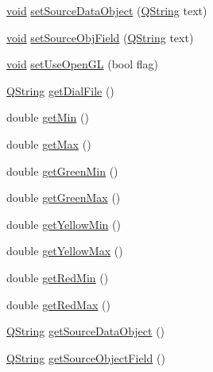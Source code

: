 \begin{DoxyCompactItemize}
\item 
\hyperlink{group___u_a_v_objects_plugin_ga444cf2ff3f0ecbe028adce838d373f5c}{void} \hyperlink{group___linear_dial_plugin_gab0e129448ff276e38c2fc87cb8883e62}{set\-Source\-Data\-Object} (\hyperlink{group___u_a_v_objects_plugin_gab9d252f49c333c94a72f97ce3105a32d}{\-Q\-String} text)
\item 
\hyperlink{group___u_a_v_objects_plugin_ga444cf2ff3f0ecbe028adce838d373f5c}{void} \hyperlink{group___linear_dial_plugin_gace43fd36313161f4a963e2b95a445354}{set\-Source\-Obj\-Field} (\hyperlink{group___u_a_v_objects_plugin_gab9d252f49c333c94a72f97ce3105a32d}{\-Q\-String} text)
\item 
\hyperlink{group___u_a_v_objects_plugin_ga444cf2ff3f0ecbe028adce838d373f5c}{void} \hyperlink{group___linear_dial_plugin_ga3834f5a345c01cce74297c2a65a82523}{set\-Use\-Open\-G\-L} (bool flag)
\item 
\hyperlink{group___u_a_v_objects_plugin_gab9d252f49c333c94a72f97ce3105a32d}{\-Q\-String} \hyperlink{group___linear_dial_plugin_ga44cbe980684b267ae41060c0428e00ce}{get\-Dial\-File} ()
\item 
double \hyperlink{group___linear_dial_plugin_ga43b18753744079052cb3b4e58a226eab}{get\-Min} ()
\item 
double \hyperlink{group___linear_dial_plugin_gae8b0681f133693a66256022babdca5cc}{get\-Max} ()
\item 
double \hyperlink{group___linear_dial_plugin_gaac4e3bef42979801094f4b3c47d83a07}{get\-Green\-Min} ()
\item 
double \hyperlink{group___linear_dial_plugin_gaf0f52dd07291d938390b228e8e0a90f2}{get\-Green\-Max} ()
\item 
double \hyperlink{group___linear_dial_plugin_gad39b6746e6b3b7c0e6d20794d2f494d9}{get\-Yellow\-Min} ()
\item 
double \hyperlink{group___linear_dial_plugin_ga2c58391f9aa712de50504d4437b54ded}{get\-Yellow\-Max} ()
\item 
double \hyperlink{group___linear_dial_plugin_ga2144cb1d1c1c13bd87529460a3ad88bc}{get\-Red\-Min} ()
\item 
double \hyperlink{group___linear_dial_plugin_ga022f5eeb2931bde01bb130ac6cb237b7}{get\-Red\-Max} ()
\item 
\hyperlink{group___u_a_v_objects_plugin_gab9d252f49c333c94a72f97ce3105a32d}{\-Q\-String} \hyperlink{group___linear_dial_plugin_ga6b635f5d74e7815014a597e5a38e5e80}{get\-Source\-Data\-Object} ()
\item 
\hyperlink{group___u_a_v_objects_plugin_gab9d252f49c333c94a72f97ce3105a32d}{\-Q\-String} \hyperlink{group___linear_dial_plugin_ga1de5843a26127b379137ee870ec74b89}{get\-Source\-Object\-Field} ()

\end{DoxyCompactItemize}
